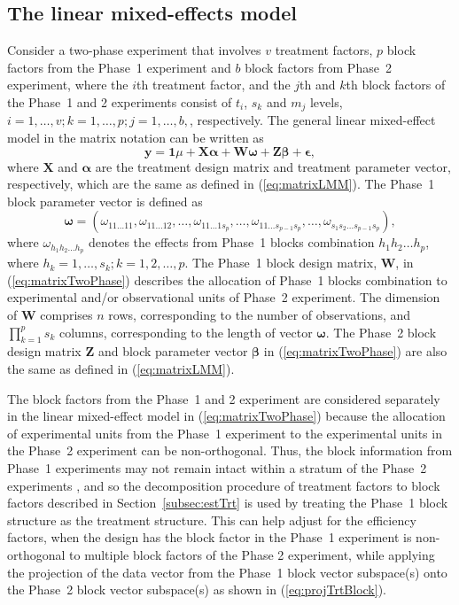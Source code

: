 \documentclass[article]{jss}
\newcommand{\Z}{\mathbf{Z}}
\newcommand{\X}{\mathbf{X}}
\newcommand{\W}{\mathbf{W}}
\begin{document}
\subsection{The linear mixed-effects model}
\label{subsec:phase2Model}
Consider a two-phase experiment that involves $v$ treatment factors, $p$ block factors from the Phase~1 experiment and $b$ block factors from Phase~2 experiment, where the $i$th treatment factor, and the $j$th and $k$th block factors of the Phase~1 and 2 experiments consist of $t_i$, $s_k$ and $m_j$ levels, $i = 1,\dots,v; k = 1,\dots,p; j = 1,\dots,b,$, respectively. The general linear mixed-effect model in the matrix notation can be written as
\begin{equation}
\label{eq:matrixTwoPhase}
\bm{y} = \bm{1}\mu + \X\bm{\alpha} + \W\bm{\omega} + \Z\bm{\beta} + \bm{\epsilon},
\end{equation}
where $\X$ and $\bm{\alpha}$ are the treatment design matrix and treatment parameter vector, respectively, which are the same as defined in (\ref{eq:matrixLMM}). The Phase~1 block parameter vector is defined as 
\begin{equation}
\label{eq:phase1BlockPar}
\bm{\omega} = (\omega_{11 \dots 11}, \omega_{11 \dots 12}, \dots,  \omega_{1 1 \dots 1s_p},\dots,\omega_{1 1 \dots s_{p-1}s_p},\dots,\omega_{s_1 s_2 \dots s_{p-1}s_p}),
\end{equation}
where $\omega_{h_1 h_2 \dots h_p}$ denotes the effects from Phase~1 blocks combination $h_1 h_2 \dots h_p$, where $h_k = 1, \dots, s_k; k = 1,2, \dots, p$. The Phase~1 block design matrix, $\W$, in (\ref{eq:matrixTwoPhase}) describes the allocation of Phase~1 blocks combination to experimental and/or observational units of Phase~2 experiment. The dimension of $\W$ comprises $n$ rows, corresponding to the number of observations, and $\prod^p_{k = 1} s_k$ columns, corresponding to the length of vector $\bm{\omega}$. The Phase~2 block design matrix $\Z$ and block parameter vector $\bm{\beta}$ in (\ref{eq:matrixTwoPhase}) are also the same as defined in (\ref{eq:matrixLMM}).

The block factors from the Phase~1 and 2 experiment are considered separately in the linear mixed-effect model in (\ref{eq:matrixTwoPhase}) because the allocation of experimental units from the Phase~1 experiment to the experimental units in the Phase~2 experiment can be non-orthogonal. Thus, the block information from Phase~1 experiments may not remain intact within a stratum of the Phase~2 experiments \citep{Wood1988}, and so the decomposition procedure of treatment factors to block factors described in Section~\ref{subsec:estTrt} is used by treating the Phase~1 block structure as the treatment structure. This can help adjust for the efficiency factors, when the design has the block factor in the Phase~1 experiment is non-orthogonal to multiple block factors of the Phase 2 experiment, while applying the projection of the data vector from the Phase~1 block vector subspace(s) onto the Phase~2 block vector subspace(s) as shown in (\ref{eq:projTrtBlock}). 
\end{document}
